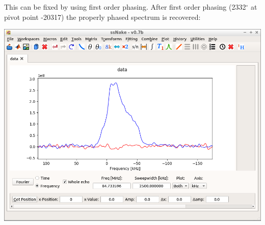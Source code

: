 \documentclass[11pt,a4paper]{article}
\begin{document}
This can be fixed by using first order phasing.
After first order phasing (2332$^\circ$ at pivot point -20317) the properly phased spectrum is recovered:
\begin{center}
\includegraphics[width=0.8\linewidth]{Figs/Fig6.png}
\end{center}
\end{document}
